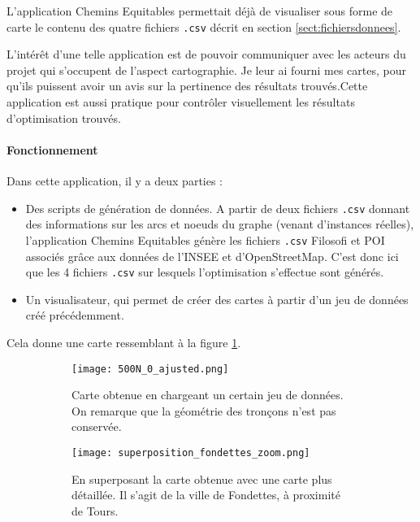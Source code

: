 L'application Chemins Equitables permettait déjà de visualiser sous forme de carte le contenu des quatre fichiers \verb|.csv| décrit en section \ref{sect:fichiersdonnees}.

L'intérêt d'une telle application est de pouvoir communiquer avec les acteurs du projet qui s'occupent de l'aspect cartographie. Je leur ai fourni mes cartes, pour qu'ils puissent avoir un avis sur la pertinence des résultats trouvés.Cette application est aussi pratique pour contrôler visuellement les résultats d'optimisation trouvés.

\paragraph{Fonctionnement}

Dans cette application, il y a deux parties :

\begin{itemize}
    \item Des scripts de génération de données. A partir de deux fichiers \verb|.csv| donnant des informations sur les arcs et noeuds du graphe (venant d'instances réelles), l'application Chemins Equitables génère les fichiers \verb|.csv| Filosofi et POI associés grâce aux données de l'INSEE et d'OpenStreetMap. C'est donc ici que les 4 fichiers \verb|.csv| sur lesquels l'optimisation s'effectue sont générés.
    \item Un visualisateur, qui permet de créer des cartes à partir d'un jeu de données créé précédemment. 
\end{itemize}

Cela donne une carte ressemblant à la figure \ref{figu:fondettes}.

\begin{figure}[H]
    \centering
    \begin{subfigure}[t]{0.45\textwidth}
        \centering
        \texttt{[image: 500N\_0\_ajusted.png]}
        \caption{Carte obtenue en chargeant un certain jeu de données. On remarque que la géométrie des tronçons n'est pas conservée.}
    \end{subfigure}
    \hfill
    \begin{subfigure}[t]{0.45\textwidth}
        \centering
        \texttt{[image: superposition\_fondettes\_zoom.png]}
        \caption{En superposant la carte obtenue avec une carte plus détaillée. Il s'agit de la ville de Fondettes, à proximité de Tours.}
    \end{subfigure}
    \hfill
    \caption{}
    \label{figu:fondettes}
\end{figure}

